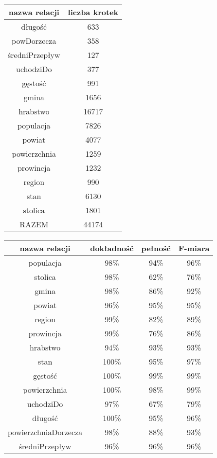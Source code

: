 \documentclass{article}
\begin{document}
\begin{table}[htbp]
\centering
\begin{tabular}{ | c | c | }
    \hline
    nazwa relacji & liczba krotek \\ \hline \hline
    długość & 633 \\ \hline
    powDorzecza & 358 \\ \hline
    średniPrzepływ & 127 \\ \hline
    uchodziDo & 377 \\ \hline \hline
    gęstość & 991 \\ \hline  
    gmina & 1656 \\ \hline    
    hrabstwo & 16717 \\ \hline
    populacja & 7826 \\ \hline
    powiat & 4077 \\ \hline
    powierzchnia & 1259 \\ \hline
    prowincja & 1232 \\ \hline
    region & 990 \\ \hline
    stan & 6130 \\ \hline
    stolica & 1801 \\ \hline\hline
    RAZEM & 44174\\ \hline
\end{tabular}
\end{table}

\begin{table}[htbp]
\centering
\begin{tabular}{ | c | c | c | c | }
    \hline
    nazwa relacji & dokładność & pełność & F-miara \\ \hline \hline
    populacja & 98\% & 94\% & 96\% \\ \hline
    stolica & 98\% & 62\% & 76\% \\ \hline
    gmina & 98\% & 86\% & 92\% \\ \hline
    powiat & 96\% & 95\% & 95\% \\ \hline
    region & 99\% & 82\% & 89\% \\ \hline
    prowincja & 99\% & 76\% & 86\% \\ \hline
    hrabstwo & 94\% & 93\% & 93\% \\ \hline
    stan & 100\% & 95\% & 97\% \\ \hline
    gęstość & 100\% & 99\% & 99\% \\ \hline
    powierzchnia & 100\% & 98\% & 99\% \\ \hline
    uchodziDo & 97\% & 67\% & 79\% \\ \hline
    długość & 100\% & 95\% & 96\% \\ \hline
    powierzchniaDorzecza & 98\% & 88\% & 93\% \\ \hline
    średniPrzepływ & 96\% & 96\% & 96\% \\ \hline
\end{tabular}
\end{table} 
\end{document}
